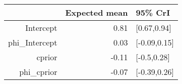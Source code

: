 \begin{tabular}{rrl}
  \hline
 & Expected mean & 95\% CrI \\ 
  \hline
Intercept & 0.81 & [0.67,0.94] \\ 
  phi\_Intercept & 0.03 & [-0.09,0.15] \\ 
  cprior & -0.11 & [-0.5,0.28] \\ 
  phi\_cprior & -0.07 & [-0.39,0.26] \\ 
   \hline
\end{tabular}

